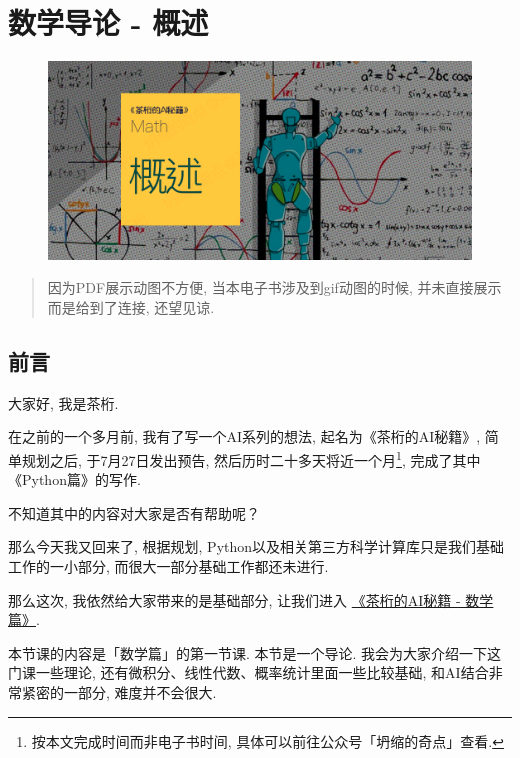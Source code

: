 \chapter{数学导论 - 概述}

\begin{figure}[ht]
  \centering\includegraphics[width=1\textwidth]{asset/茶桁的AI秘籍_Math_1.png}
\end{figure}

\newpage
\begin{quotation}
  因为PDF展示动图不方便, 当本电子书涉及到gif动图的时候, 并未直接展示而是给到了连接, 还望见谅. 
\end{quotation}

\section{前言}

大家好, 我是茶桁. 

在之前的一个多月前, 我有了写一个AI系列的想法, 起名为《茶桁的AI秘籍》, 简单规划之后, 于7月27日发出预告, 然后历时二十多天将近一个月\footnote{按本文完成时间而非电子书时间, 具体可以前往公众号「坍缩的奇点」查看. }, 完成了其中《Python篇》的写作.  

不知道其中的内容对大家是否有帮助呢？

那么今天我又回来了, 根据规划, Python以及相关第三方科学计算库只是我们基础工作的一小部分, 而很大一部分基础工作都还未进行. 

那么这次, 我依然给大家带来的是基础部分, 让我们进入 \href{https://mp.weixin.qq.com/mp/appmsgalbum?__biz=MzA4NzE4MDQzMg==&action=getalbum&album_id=3074770001140400130&from_itemidx=1&from_msgid=2648748768#wechat_redirect}{《茶桁的AI秘籍 - 数学篇》}. 

本节课的内容是「数学篇」的第一节课. 本节是一个导论. 我会为大家介绍一下这门课一些理论, 还有微积分、线性代数、概率统计里面一些比较基础, 和AI结合非常紧密的一部分, 难度并不会很大. 

